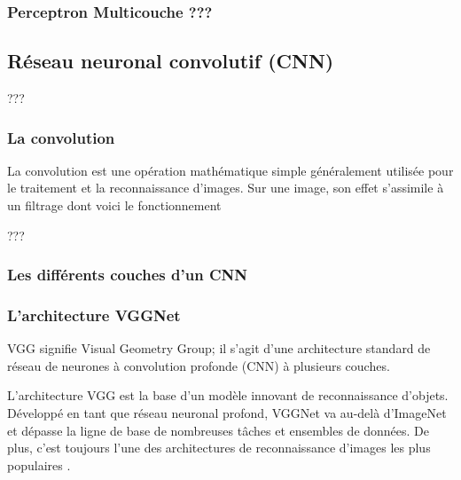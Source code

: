 	\subsubsection{Perceptron Multicouche ???}



	
	
	\subsection{Réseau neuronal convolutif (CNN)}
	???
	\cite{shin2016deep} 
	
	\subsubsection{La convolution}
	
	La convolution est une opération mathématique simple généralement utilisée pour le traitement et la reconnaissance d’images. Sur une image, son effet s’assimile à un filtrage dont voici le fonctionnement
	
	???
	\lipsum[1]
	\subsubsection{Les différents couches d'un CNN}
	\lipsum[1]
	\subsubsection{L'architecture VGGNet}
	
	VGG signifie Visual Geometry Group; il s'agit d'une architecture standard de réseau de neurones à convolution profonde (CNN) à plusieurs couches. %
	
	
	
	L'architecture VGG est  la base d'un modèle innovant de reconnaissance d'objets. Développé en tant que réseau neuronal profond,  VGGNet va au-delà d'ImageNet et dépasse la ligne de base  de nombreuses tâches et ensembles de données. De plus, c'est toujours l'une des architectures de reconnaissance d'images les plus populaires \cite{tammina2019transfer, antoine2018apprentissage}.
	
